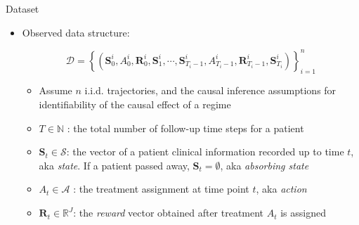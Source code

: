 \documentclass[final,hyperref={pdfpagelabels=false}]{beamer}
\newcommand{\bs}{ \boldsymbol}
\newcommand{\mb}{\mathbb}
\newcommand{\ml}{\mathcal}
\newcommand{\lt}{\left}
\newcommand{\rt}{\right}
\begin{document}
\begin{frame}[t]
\begin{columns}[t]
\begin{column}{.465\textwidth}
\begin{block}{Dataset}
\begin{itemize}
\item Observed data structure: 

$$\ml{D} = \lt\{  (\bs{S}^i_{0}, A^i_{0}, \bs{R}^i_{0} , \bs{S}^i_{1}, \cdots, 
\bs{S}^i_{T_i-1} , A^i_{T_i-1}, \bs{R}^i_{T_i-1}, \bs{S}^i_{T_i}) \rt\}_{i=1}^n$$
\begin{itemize}
 \item Assume $n$ i.i.d. trajectories, and the causal inference assumptions for identifiability of the causal effect of a regime
 \item $T \in \mb{N}$ : the total number of follow-up time steps for a patient
 \item $\bs{S}_{t} \in \bs{\ml{S}}$: the vector of a patient clinical information recorded up to time $t$, aka \textit{ state}. If a patient passed away, $\bs{S}_t = \bs{\emptyset}$, aka \textit{absorbing state}
 \item $A_{t} \in \ml{A}$ : the treatment assignment at time point $t$,  aka \textit{action}
 \item $\bs{R}_{t} \in \mb{R}^J$: the 
 \textit{reward} vector obtained after treatment $A_{t}$ is assigned
\end{itemize}
\end{itemize}
\end{block}


\end{column}
\end{columns}
\end{frame}
\end{document}
